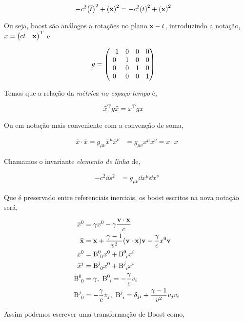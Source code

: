 \documentclass[twoside]{amsart}
\numberwithin{equation}{section}
\begin{document}
\begin{align}
    -c^2\qty({\bar t})^2+\qty(\vb{\bar x})^2&=-c^2\qty(t)^2+\qty(\vb x)^2
\end{align}

Ou seja, boost são análogos a rotações no plano $\vb x-t$, introduzindo a notação, $x=\mqty(ct & \vb x)^\textup T$ e 

\begin{align}
    g&=\mqty(-1 & 0 & 0& 0\\ 0&1&0&0\\0&0&1&0\\0&0&0&1)
\end{align}

Temos que a relação da \emph{métrica no espaço-tempo} é,

\begin{align}
    {\bar x}^\textup T g \bar x&=x^\textup T g x
\end{align}

Ou em notação mais conveniente com a convenção de soma,

\begin{align}
    \bar x\cdot \bar x=g_{\mu\nu}{\bar x}^\mu {\bar x}^\nu&=g_{\mu\nu}x^\mu x^\nu=x\cdot x
\end{align}

Chamamos o invariante \emph{elemento de linha} de,

\begin{align}
    -c^2\dd{s}^2&=g_{\mu\nu}\dd{x^\mu}\dd{x^\nu}
\end{align}

Que é preservado entre referenciais inerciais, os boost escritos na nova notação será,

\begin{align}
    {\bar x}^0&=\gamma x^0-\gamma\frac{\vb v\cdot\vb x}{c}\\
    \vb {\bar x}&=\vb x+\frac{\gamma-1}{v^2}\qty(\vb v \cdot \vb x)\vb v-\frac{\gamma}{c} x^0\vb v\\
    {\bar x}^0&={\textup B}^0_{\ 0}x^0+{\textup B}^0_{\ i}x^i\\
    {\bar x}^j&={\textup B}^j_{\ 0}x^0+{\textup B}^j_{\ i}x^i\\
    {\textup B}^0_{\ 0}&=\gamma,\ {\textup B}^0_{\ i}=-\frac{\gamma}{c}v_i\\
    {\textup B}^j_{\ 0}&=-\frac{\gamma}{c}v_j,\ {\textup B}^j_{\ i}=\delta_{ji}+\frac{\gamma-1}{v^2}v_jv_i
\end{align}

Assim podemos escrever uma transformação de Boost como,
\end{document}

